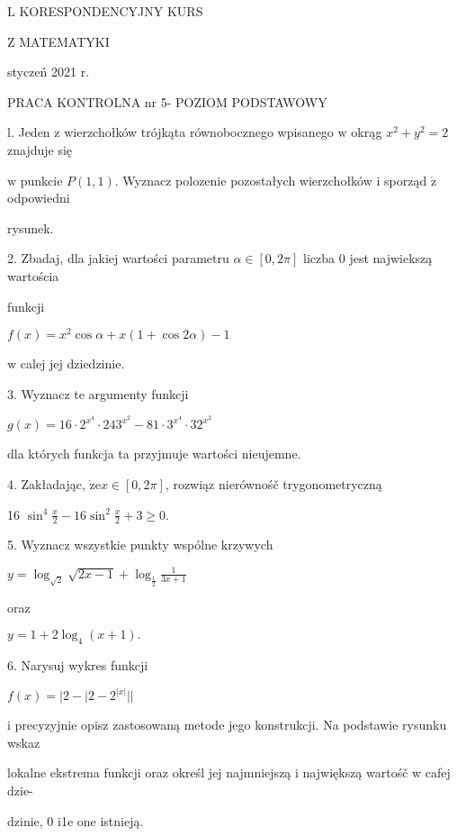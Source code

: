 \documentclass[a4paper,12pt]{article}
\begin{document}
L KORESPONDENCYJNY KURS

Z MATEMATYKI

styczeń 2021 r.

PRACA KONTROLNA nr 5- POZIOM PODSTAWOWY

l. Jeden $\mathrm{z}$ wierzchołków trójkąta równobocznego wpisanego $\mathrm{w}$ okrąg $x^{2}+y^{2}=2$ znajduje się

$\mathrm{w}$ punkcie $P(1,1)$. Wyznacz polozenie pozostałych wierzchołków $\mathrm{i}$ sporząd $\acute{\mathrm{z}}$ odpowiedni

rysunek.

2. Zbadaj, dla jakiej wartości parametru $\alpha \in [0,2\pi]$ liczba 0 jest najwiekszą wartościa

funkcji

$f(x)=x^{2}\cos\alpha+x(1+\cos 2\alpha)-1$

$\mathrm{w}$ calej jej dziedzinie.

3. Wyznacz te argumenty funkcji

$g(x)=16\cdot 2^{x^{4}}\cdot 243^{x^{2}}-81\cdot 3^{x^{4}}\cdot 32^{x^{2}}$

dla których funkcja ta przyjmuje wartości nieujemne.

4. Zakładając, $\dot{\mathrm{z}}\mathrm{e}x\in[0,2\pi]$, rozwiąz nierównośč trygonometryczną

16 $\displaystyle \sin^{4}\frac{x}{2}-16\sin^{2}\frac{x}{2}+3\geq 0.$

5. Wyznacz wszystkie punkty wspólne krzywych

$y=\displaystyle \log_{\sqrt{2}}\sqrt{2x-1}+\log_{\frac{1}{2}}\frac{1}{3x+1}$

oraz

$y=1+2\log_{4}(x+1).$

6. Narysuj wykres funkcji

$f(x)=|2-|2-2^{|x|}||$

i precyzyjnie opisz zastosowaną metode jego konstrukcji. Na podstawie rysunku wskaz

lokalne ekstrema funkcji oraz określ jej najmniejszą i największą wartośč w cafej dzie-

dzinie, 0 i1e one istnieją.
\end{document}
